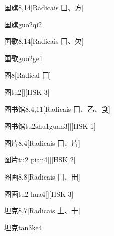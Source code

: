 \begin{entry}{国旗}{8,14}[Radicais ⼞、⽅]
  \begin{phonetics}{国旗}{guo2qi2}
  \end{phonetics}
\end{entry}

\begin{entry}{国歌}{8,14}[Radicais ⼞、⽋]
  \begin{phonetics}{国歌}{guo2ge1}
  \end{phonetics}
\end{entry}

\begin{entry}{图}{8}[Radical ⼞]
  \begin{phonetics}{图}{tu2}[][HSK 3]
  \end{phonetics}
\end{entry}

\begin{entry}{图书馆}{8,4,11}[Radicais ⼞、⼄、⾷]
  \begin{phonetics}{图书馆}{tu2shu1guan3}[][HSK 1]
  \end{phonetics}
\end{entry}

\begin{entry}{图片}{8,4}[Radicais ⼞、⽚]
  \begin{phonetics}{图片}{tu2 pian4}[][HSK 2]
  \end{phonetics}
\end{entry}

\begin{entry}{图画}{8,8}[Radicais ⼞、⽥]
  \begin{phonetics}{图画}{tu2 hua4}[][HSK 3]
  \end{phonetics}
\end{entry}

\begin{entry}{坦克}{8,7}[Radicais ⼟、⼗]
  \begin{phonetics}{坦克}{tan3ke4}
  \end{phonetics}
\end{entry}

